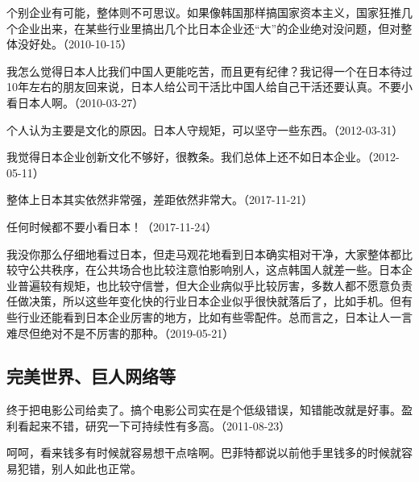 
个别企业有可能，整体则不可思议。如果像韩国那样搞国家资本主义，国家狂推几个企业出来，在某些行业里搞出几个比日本企业还“大”的企业绝对没问题，但对整体没好处。（2010-10-15）


我怎么觉得日本人比我们中国人更能吃苦，而且更有纪律？我记得一个在日本待过10年左右的朋友回来说，日本人给公司干活比中国人给自己干活还要认真。不要小看日本人啊。（2010-03-27）


个人认为主要是文化的原因。日本人守规矩，可以坚守一些东西。（2012-03-31）


我觉得日本企业创新文化不够好，很教条。我们总体上还不如日本企业。（2012-05-11）


整体上日本其实依然非常强，差距依然非常大。（2017-11-21）

任何时候都不要小看日本！（2017-11-24）

我没你那么仔细地看过日本，但走马观花地看到日本确实相对干净，大家整体都比较守公共秩序，在公共场合也比较注意怕影响别人，这点韩国人就差一些。日本企业普遍较有规矩，也比较守信誉，但大企业病似乎比较厉害，多数人都不愿意负责任做决策，所以这些年变化快的行业日本企业似乎很快就落后了，比如手机。但有些行业还能看到日本企业厉害的地方，比如有些零配件。总而言之，日本让人一言难尽但绝对不是不厉害的那种。（2019-05-21）

\subsection{完美世界、巨人网络等}


终于把电影公司给卖了。搞个电影公司实在是个低级错误，知错能改就是好事。盈利看起来不错，研究一下可持续性有多高。（2011-08-23）


呵呵，看来钱多有时候就容易想干点啥啊。巴菲特都说以前他手里钱多的时候就容易犯错，别人如此也正常。


